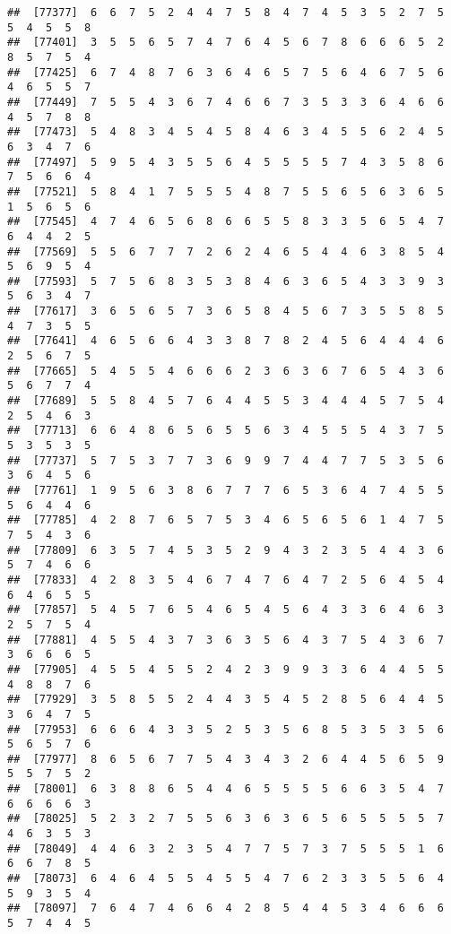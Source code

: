 \documentclass[
]{book}
\begin{document}
\begin{verbatim}
##  [77377]  6  6  7  5  2  4  4  7  5  8  4  7  4  5  3  5  2  7  5  5  4  5  5  8
##  [77401]  3  5  5  6  5  7  4  7  6  4  5  6  7  8  6  6  6  5  2  8  5  7  5  4
##  [77425]  6  7  4  8  7  6  3  6  4  6  5  7  5  6  4  6  7  5  6  4  6  5  5  7
##  [77449]  7  5  5  4  3  6  7  4  6  6  7  3  5  3  3  6  4  6  6  4  5  7  8  8
##  [77473]  5  4  8  3  4  5  4  5  8  4  6  3  4  5  5  6  2  4  5  6  3  4  7  6
##  [77497]  5  9  5  4  3  5  5  6  4  5  5  5  5  7  4  3  5  8  6  7  5  6  6  4
##  [77521]  5  8  4  1  7  5  5  5  4  8  7  5  5  6  5  6  3  6  5  1  5  6  5  6
##  [77545]  4  7  4  6  5  6  8  6  6  5  5  8  3  3  5  6  5  4  7  6  4  4  2  5
##  [77569]  5  5  6  7  7  7  2  6  2  4  6  5  4  4  6  3  8  5  4  5  6  9  5  4
##  [77593]  5  7  5  6  8  3  5  3  8  4  6  3  6  5  4  3  3  9  3  5  6  3  4  7
##  [77617]  3  6  5  6  5  7  3  6  5  8  4  5  6  7  3  5  5  8  5  4  7  3  5  5
##  [77641]  4  6  5  6  6  4  3  3  8  7  8  2  4  5  6  4  4  4  6  2  5  6  7  5
##  [77665]  5  4  5  5  4  6  6  6  2  3  6  3  6  7  6  5  4  3  6  5  6  7  7  4
##  [77689]  5  5  8  4  5  7  6  4  4  5  5  3  4  4  4  5  7  5  4  2  5  4  6  3
##  [77713]  6  6  4  8  6  5  6  5  5  6  3  4  5  5  5  4  3  7  5  5  3  5  3  5
##  [77737]  5  7  5  3  7  7  3  6  9  9  7  4  4  7  7  5  3  5  6  3  6  4  5  6
##  [77761]  1  9  5  6  3  8  6  7  7  7  6  5  3  6  4  7  4  5  5  5  6  4  4  6
##  [77785]  4  2  8  7  6  5  7  5  3  4  6  5  6  5  6  1  4  7  5  7  5  4  3  6
##  [77809]  6  3  5  7  4  5  3  5  2  9  4  3  2  3  5  4  4  3  6  5  7  4  6  6
##  [77833]  4  2  8  3  5  4  6  7  4  7  6  4  7  2  5  6  4  5  4  6  4  6  5  5
##  [77857]  5  4  5  7  6  5  4  6  5  4  5  6  4  3  3  6  4  6  3  2  5  7  5  4
##  [77881]  4  5  5  4  3  7  3  6  3  5  6  4  3  7  5  4  3  6  7  3  6  6  6  5
##  [77905]  4  5  5  4  5  5  2  4  2  3  9  9  3  3  6  4  4  5  5  4  8  8  7  6
##  [77929]  3  5  8  5  5  2  4  4  3  5  4  5  2  8  5  6  4  4  5  3  6  4  7  5
##  [77953]  6  6  6  4  3  3  5  2  5  3  5  6  8  5  3  5  3  5  6  5  6  5  7  6
##  [77977]  8  6  5  6  7  7  5  4  3  4  3  2  6  4  4  5  6  5  9  5  5  7  5  2
##  [78001]  6  3  8  8  6  5  4  4  6  5  5  5  5  6  6  3  5  4  7  6  6  6  6  3
##  [78025]  5  2  3  2  7  5  5  6  3  6  3  6  5  6  5  5  5  5  7  4  6  3  5  3
##  [78049]  4  4  6  3  2  3  5  4  7  7  5  7  3  7  5  5  5  1  6  6  6  7  8  5
##  [78073]  6  4  6  4  5  5  4  5  5  4  7  6  2  3  3  5  5  6  4  5  9  3  5  4
##  [78097]  7  6  4  7  4  6  6  4  2  8  5  4  4  5  3  4  6  6  6  5  7  4  4  5

\end{verbatim}
\end{document}
